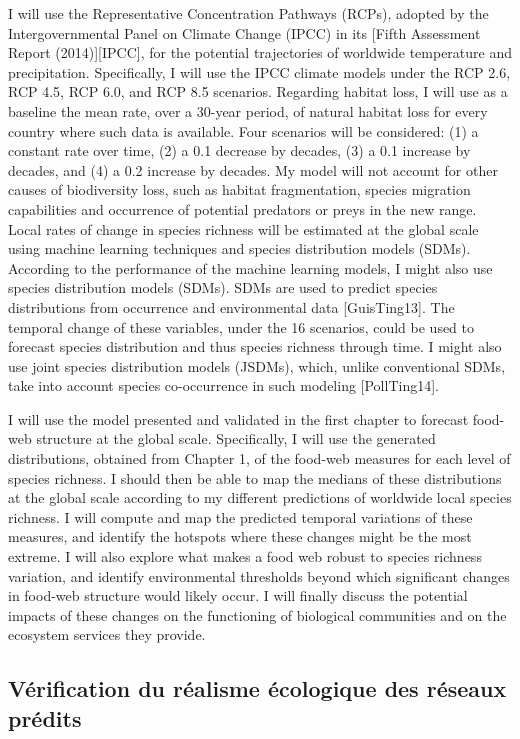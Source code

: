 I will use the Representative
Concentration Pathways (RCPs), adopted by the Intergovernmental Panel on Climate
Change (IPCC) in its [Fifth Assessment Report (2014)][IPCC], for the potential
trajectories of worldwide temperature and precipitation. Specifically, I will
use the IPCC climate models under the RCP 2.6, RCP 4.5, RCP 6.0, and RCP 8.5
scenarios. Regarding habitat loss, I will use as a baseline the mean rate, over a 30-year
period, of natural habitat loss for every country where such data is available.
Four scenarios will be considered: (1) a constant rate over time, (2) a 0.1
decrease by decades, (3) a 0.1 increase by decades, and (4) a 0.2 increase by
decades. My model will not account for other causes of biodiversity loss, such as habitat
fragmentation, species migration capabilities and occurrence of potential
predators or preys in the new range. Local rates of change in species richness will be
estimated at the global scale using machine learning techniques and species
distribution models (SDMs). According to the performance of the machine learning models, I might also use
species distribution models (SDMs). SDMs are used to predict species
distributions  from occurrence and environmental data [GuisTing13]. The temporal
change of these variables, under the 16 scenarios, could be used to forecast
species distribution and thus species richness through time. I might also use
joint species distribution models (JSDMs), which, unlike conventional SDMs, take
into account species co-occurrence in such modeling [PollTing14].

I will use the model presented and validated in
the first chapter to forecast food-web structure at the global scale.
Specifically, I will use the generated distributions, obtained from Chapter 1,
of the food-web measures for each level of species richness. I should then be
able to map the medians of these distributions at the global scale according to
my different predictions of worldwide local species richness. I will compute and map the predicted temporal variations of these measures, and
identify the hotspots where these changes might be the most extreme. I will also
explore what makes a food web robust to species richness variation, and identify
environmental thresholds beyond which significant changes in food-web structure
would likely occur. I will finally discuss the potential impacts of these changes on the functioning
of biological communities and on the ecosystem services they provide.

\subsection{Vérification du réalisme écologique des réseaux prédits} 

